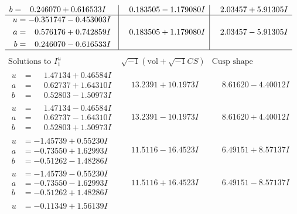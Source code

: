 \documentclass[1p]{elsarticle_modified}
\theoremstyle{definition}
\newcommand{\I}{\sqrt{-1}}
\begin{document}
$$\begin{array}{c|c|c}
\begin{aligned}
b &= \phantom{-}0.246070 + 0.616533 I\end{aligned}
 & \phantom{-}0.183505 - 1.179080 I & \phantom{-}2.03457 + 5.91305 I \\ \hline\begin{aligned}
u &= -0.351747 - 0.453003 I \\
a &= \phantom{-}0.576176 + 0.742859 I \\
b &= \phantom{-}0.246070 - 0.616533 I\end{aligned}
 & \phantom{-}0.183505 + 1.179080 I & \phantom{-}2.03457 - 5.91305 I\\
 \hline 
 \end{array}$$\newpage$$\begin{array}{c|c|c}  
\text{Solutions to }I^u_{1}& \I (\text{vol} + \sqrt{-1}CS) & \text{Cusp shape}\\
 \hline 
\begin{aligned}
u &= \phantom{-}1.47134 + 0.46584 I \\
a &= \phantom{-}0.62737 + 1.64310 I \\
b &= \phantom{-}0.52803 - 1.50973 I\end{aligned}
 & \phantom{-}13.2391 + 10.1973 I & \phantom{-}8.61620 - 4.40012 I \\ \hline\begin{aligned}
u &= \phantom{-}1.47134 - 0.46584 I \\
a &= \phantom{-}0.62737 - 1.64310 I \\
b &= \phantom{-}0.52803 + 1.50973 I\end{aligned}
 & \phantom{-}13.2391 - 10.1973 I & \phantom{-}8.61620 + 4.40012 I \\ \hline\begin{aligned}
u &= -1.45739 + 0.55230 I \\
a &= -0.73550 + 1.62993 I \\
b &= -0.51262 - 1.48286 I\end{aligned}
 & \phantom{-}11.5116 - 16.4523 I & \phantom{-}6.49151 + 8.57137 I \\ \hline\begin{aligned}
u &= -1.45739 - 0.55230 I \\
a &= -0.73550 - 1.62993 I \\
b &= -0.51262 + 1.48286 I\end{aligned}
 & \phantom{-}11.5116 + 16.4523 I & \phantom{-}6.49151 - 8.57137 I \\ \hline\begin{aligned}
u &= -0.11349 + 1.56139 I \\

\end{aligned}
\end{array}$$
\end{document}
